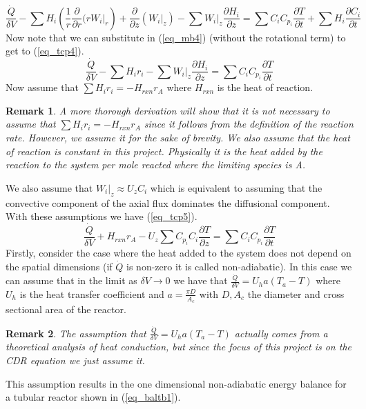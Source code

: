 \documentclass[11pt,fleqn]{article}
\theoremstyle{defstyle}
\newtheorem{rmrk}{Remark}[section]
\begin{document}
\begin{equation}
\frac{\dot{Q}}{\delta V} - \sum H_i \left(\frac{1}{r}\frac{\partial}{\partial r}(r W_i|_r\right)+\frac{\partial}{\partial z}\left(W_i|_z\right) - \sum W_i|_z \frac{\partial H_i}{\partial z} =\sum C_i C_{p_i} \frac{\partial T}{\partial t} + \sum H_i \frac{\partial C_i}{\partial t}
\label{eq_tcp3}
\end{equation}
Now note that we can substitute in (\ref{eq_mb4}) (without the rotational term) to get to (\ref{eq_tcp4}).
\begin{equation}
\frac{\dot{Q}}{\delta V} - \sum H_i r_i - \sum W_i|_z \frac{\partial H_i}{\partial z} =\sum C_i C_{p_i} \frac{\partial T}{\partial t}
\label{eq_tcp4}
\end{equation}
Now assume that $\sum H_i r_i = -H_{rxn}r_A$ where $H_{rxn}$ is the heat of reaction.
\begin{rmrk}
A more thorough derivation will show that it is not necessary to assume that $\sum H_i r_i = -H_{rxn}r_A$ since it follows from the definition of the reaction rate. However, we assume it for the sake of brevity. We also assume that the heat of reaction is constant in this project. Physically it is the heat added by the reaction to the system per mole reacted where the limiting species is A.
\end{rmrk}
We also assume that $W_i|_z \approx U_z C_i$ which is equivalent to assuming that the convective component of the axial flux dominates the diffusional component. With these assumptions we have (\ref{eq_tcp5}).
\begin{equation}
\frac{\dot{Q}}{\delta V} + H_{rxn}r_A - U_z\sum C_{p_i}C_i \frac{\partial T}{\partial z} =\sum C_i C_{p_i} \frac{\partial T}{\partial t}
\label{eq_tcp5}
\end{equation}
Firstly, consider the case where the heat added to the system does not depend on the spatial dimensions (if $\dot{Q}$ is non-zero it is called non-adiabatic). In this case we can assume that in the limit as $\delta V \rightarrow 0 $ we have that $\frac{\dot{Q}}{\delta V} = U_ha(T_a-T)$ where $U_h$ is the heat transfer coefficient and $a = \frac{\pi D}{A_c}$ with $D, A_c$ the diameter and cross sectional area of the reactor.
\begin{rmrk}
The assumption that $\frac{\dot{Q}}{\delta V} = U_ha(T_a-T)$ actually comes from a theoretical analysis of heat conduction, but since the focus of this project is on the CDR equation we just assume it. 
\end{rmrk} 
This assumption results in the one dimensional non-adiabatic energy balance for a tubular reactor shown in (\ref{eq_baltb1}).
\end{document}
